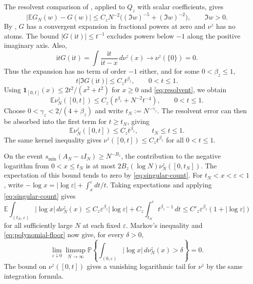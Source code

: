 The resolvent comparison of \cite[Corollary~1.3 of arXiv v1]{CGP22}, applied to $Q_z$ with scalar coefficients, gives
\begin{equation}\label{eq:resolvent}
 \big|\mathbb E G_N(w)-G(w)\big|
 \le C_z N^{-2}\big((\Im w)^{-5}+(\Im w)^{-2}\big),
 \qquad \Im w>0 .
\end{equation}
By \cite[Theorem~1.1(5)--(6) and Corollary~1.2]{SS15}, $G$ has a convergent expansion in fractional powers at zero and $\nu^z$ has no atoms.
The bound $|G(\mathrm{i}t)|\le t^{-1}$ excludes powers below $-1$ along the positive imaginary axis.
Also,
\[
 \mathrm{i}tG(\mathrm{i}t)=\int\frac{\mathrm{i}t}{\mathrm{i}t-x}\,d\nu^z(x)
   \longrightarrow \nu^z(\{0\})=0 .
\]
Thus the expansion has no term of order $-1$ either, and for some $0<\beta_z\le 1$,
\[
 t|\Im G(\mathrm{i}t)|\le C_z t^{\beta_z},\qquad 0<t\le 1 .
\]
Using $\mathbf 1_{[0,t]}(x)\le 2t^2/(x^2+t^2)$ for $x\ge 0$ and \eqref{eq:resolvent}, we obtain
\[
 \mathbb E\nu_N^z([0,t])
 \le C_z(t^{\beta_z}+N^{-2}t^{-4}),\qquad 0<t\le 1.
\]
Choose $0<\gamma_z<2/(4+\beta_z)$ and write $t_N:=N^{-\gamma_z}$.
The resolvent error can then be absorbed into the first term for $t\ge t_N$, giving
\begin{equation}\label{eq:singular-count}
 \mathbb E\nu_N^z([0,t])\le C_z t^{\beta_z},
 \qquad t_N\le t\le 1 .
\end{equation}
The same kernel inequality gives $\nu^z([0,t])\le C_z t^{\beta_z}$ for all $0<t\le 1$.

On the event $s_{\min}(A_N-zI_N)\ge N^{-B_z}$, the contribution to the negative logarithm from $0<x\le t_N$ is at most $2B_z(\log N)\nu_N^z([0,t_N])$.
The expectation of this bound tends to zero by \eqref{eq:singular-count}.
For $t_N<x<\varepsilon<1$, write $-\log x=|\log\varepsilon|+\int_x^\varepsilon dt/t$.
Taking expectations and applying \eqref{eq:singular-count} gives
\[
 \mathbb E\int_{(t_N,\varepsilon)}|\log x|\,d\nu_N^z(x)
 \le C_z\varepsilon^{\beta_z}|\log\varepsilon|
     +C_z\int_{t_N}^{\varepsilon} t^{\beta_z-1}\,dt
 \le C'_z\varepsilon^{\beta_z}(1+|\log\varepsilon|)
\]
for all sufficiently large $N$ at each fixed $\varepsilon$.
Markov's inequality and \eqref{eq:polynomial-floor} now give, for every $\delta>0$,
\begin{equation}\label{eq:log-tail}
 \lim_{\varepsilon\downarrow 0}\limsup_{N\to\infty}
 \mathbb P\!\left\{\int_{(0,\varepsilon)}|\log x|\,d\nu_N^z(x)>\delta\right\}=0 .
\end{equation}
The bound on $\nu^z([0,t])$ gives a vanishing logarithmic tail for $\nu^z$ by the same integration formula.

